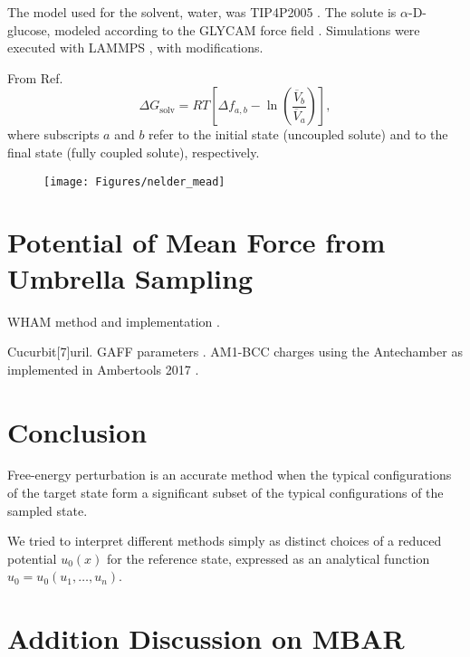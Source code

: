 \documentclass[journal=jctcce,manuscript=article,layout=twocolumn]{achemso}
\newcommand{\avg}[1]{\overline{#1}}             %
\begin{document}
The model used for the solvent, water, was TIP4P2005 \cite{Abascal_2005}. The solute is $\alpha$-D-glucose, modeled according to the GLYCAM force field \cite{Kirschner_2007}. Simulations were executed with LAMMPS \cite{Plimpton_1995}, with modifications.



From Ref.~
\begin{equation*}
{\Delta G}_\text{solv} = RT \left[{\Delta f}_{a,b} - \ln \left(\frac{\avg{V}_b}{\avg{V}_a}\right)\right],
\end{equation*}
where subscripts $a$ and $b$ refer to the initial state (uncoupled solute) and to the final state (fully coupled solute), respectively. 

\begin{figure}
	\centering
	\texttt{[image: Figures/nelder\_mead]}
	\caption{}
	\label{fig:nelder_mead}
\end{figure}


\section{Potential of Mean Force from Umbrella Sampling}

WHAM method\cite{Kumar_1992} and implementation \cite{Grossfield_nodate}.

Cucurbit[7]uril. GAFF parameters \cite{Wang_2004}. AM1-BCC charges \cite{Jakalian_2000, Jakalian_2002} using the Antechamber \cite{Wang_2006} as implemented in Ambertools 2017 \cite{Case_2017}.

\section{Conclusion}

Free-energy perturbation is an accurate method when the typical configurations of the target state form a significant subset of the typical configurations of the sampled state.

We tried to interpret different methods simply as distinct choices of a reduced potential $u_0(x)$ for the reference state, expressed as an analytical function $u_0 = u_0(u_1,\dots,u_n)$.

\appendix

\section{Addition Discussion on MBAR}
\label{sec:subsampling and uncertainty in MBAR}
\end{document}
